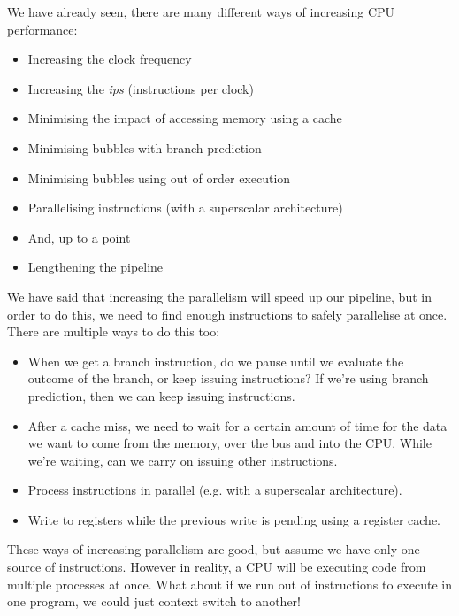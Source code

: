 We have already seen, there are many different ways of increasing CPU
performance:

\begin{itemize}
  \item Increasing the clock frequency
  \item Increasing the \textit{ips} (instructions per clock)
  \item Minimising the impact of accessing memory using a cache
  \item Minimising bubbles with branch prediction
  \item Minimising bubbles using out of order execution
  \item Parallelising instructions (with a superscalar architecture)
  \item[ ] \hspace{-2.3em}And, up to a point
  \item Lengthening the pipeline
\end{itemize}

We have said that increasing the parallelism will speed up our pipeline, but in
order to do this, we need to find enough instructions to safely parallelise at
once. There are multiple ways to do this too:

\begin{itemize}
  \item When we get a branch instruction, do we pause until we evaluate the
  outcome of the branch, or keep issuing instructions? If we're using branch
  prediction, then we can keep issuing instructions.

  \item After a cache miss, we need to wait for a certain amount of time for the
  data we want to come from the memory, over the bus and into the CPU. While
  we're waiting, can we carry on issuing other instructions.

  \item Process instructions in parallel (e.g. with a superscalar architecture).

  \item Write to registers while the previous write is pending using a register
  cache.
\end{itemize}

These ways of increasing parallelism are good, but assume we have only one source
of instructions. However in reality, a CPU will be executing code from multiple
processes at once. What about if we run out of instructions to execute in one
program, we could just context switch to another!

